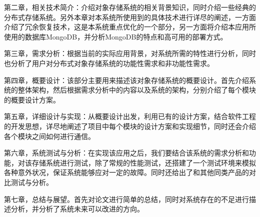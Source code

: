第二章，相关技术简介：介绍对象存储系统的相关背景知识，同时介绍一些经典的分布式存储系统。另外本章对本系统所使用到的具体技术进行详尽的阐述，一方面介绍了冗余恢复技术，这是本系统重点优化的一个部分，另一方面将介绍本应用所使用的数据库MongoDB，并分析MongoDB的特点和高可用的部署方式。 

第三章，需求分析：根据当前的实际应用背景，对系统所需的特性进行分析，同时也分析了用户对分布式对象存储系统的功能性需求和非功能性需求。

第四章，概要设计：该部分主要用来描述该对象存储系统的概要设计。首先介绍系统的整体架构，然后根据需求分析中的内容以及系统的架构，分别介绍了每个模块的概要设计方案。

第五章，详细设计与实现：从概要设计出发，利用已有的设计方案，结合软件工程的开发思想，详尽地阐述了项目中每个模块的设计方案和实现细节，同时还会介绍各个模块之间如何进行通信。

第六章，系统测试与分析：在实现该应用之后，我们要结合该系统的需求分析和功能，对该存储系统进行测试，除了常规的性能测试，还搭建了一个测试环境来模拟各种意外状况，保证系统能够应对一定的故障。同时还给出了和其他同类产品的对比测试与分析。

第七章，总结与展望。首先对论文进行简单的总结，同时对系统存在的不足进行描述分析，并分析了系统未来可以改进的方向。